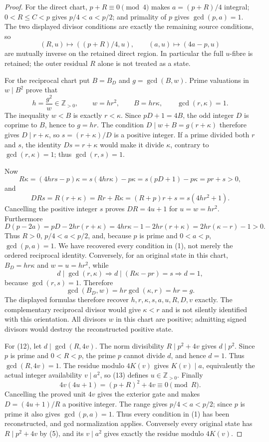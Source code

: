 \begin{proof}
For the direct chart, $p+R\equiv0\pmod4$ makes $a=(p+R)/4$ integral;
$0<R\le C<p$ gives $p/4<a<p/2$; and primality of $p$ gives
$\gcd(p,a)=1$.  The two displayed divisor conditions are exactly the
remaining source conditions, so
\[
 (R,u)\longmapsto ((p+R)/4,u),\qquad
 (a,u)\longmapsto(4a-p,u)
\]
are mutually inverse on the retained direct region.  In particular the full
$u$-fibre is retained; the outer residual $R$ alone is not treated as a state.

For the reciprocal chart put $B=B_D$ and
$g=\gcd(B,w)$.  Prime valuations in $w\mid B^2$ prove that
\[
 h=\frac{g^2}{w}\in\mathbb Z_{>0},\qquad
 w=hr^2,\qquad B=hr\kappa,\qquad \gcd(r,\kappa)=1.
\]
The inequality $w<B$ is exactly $r<\kappa$.  Since $pD+1=4B$, the odd
integer $D$ is coprime to $B$, hence to $g=hr$.  The condition
$D\mid w+B=g(r+\kappa)$ therefore gives $D\mid r+\kappa$, so
$s=(r+\kappa)/D$ is a positive integer.  If a prime divided both $r$ and
$s$, the identity $Ds=r+\kappa$ would make it divide $\kappa$, contrary to
$\gcd(r,\kappa)=1$; thus $\gcd(r,s)=1$.

Now
\[
 R\kappa=(4hrs-p)\kappa
 =s(4hr\kappa)-p\kappa
 =s(pD+1)-p\kappa=pr+s>0,
\]
and
\[
 DRs=R(r+\kappa)=Rr+R\kappa
 =(R+p)r+s=s(4hr^2+1).
\]
Cancelling the positive integer $s$ proves $DR=4u+1$ for
$u=w=hr^2$.  Furthermore
\[
 D(p-2a)=pD-2hr(r+\kappa)
 =4hr\kappa-1-2hr(r+\kappa)
 =2hr(\kappa-r)-1>0.
\]
Thus $R>0$, $p/4<a<p/2$, and, because $p$ is prime and $0<a<p$,
$\gcd(p,a)=1$.  We have recovered every condition in (1), not merely the
ordered reciprocal identity.  Conversely, for an original state in this
chart, $B_D=hr\kappa$ and $w=u=hr^2$, while
\[
 d\mid\gcd(r,\kappa)\Longrightarrow d\mid(R\kappa-pr)=s
 \Longrightarrow d=1,
\]
because $\gcd(r,s)=1$.  Therefore
\[
 \gcd(B_D,w)=hr\gcd(\kappa,r)=hr=g.
\]
The displayed formulas therefore recover $h,r,\kappa,s,a,u,R,D,v$ exactly.
The complementary reciprocal divisor would give $\kappa<r$ and is not silently
identified with this orientation.  All divisors $w$ in this chart are positive;
admitting signed divisors would destroy the reconstructed positive state.

For (12), let $d\mid\gcd(R,4v)$.  The norm divisibility
$R\mid p^2+4v$ gives $d\mid p^2$.  Since $p$ is prime and $0<R<p$, the
prime $p$ cannot divide $d$, and hence $d=1$.  Thus
$\gcd(R,4v)=1$. The residue modulo $4K(v)$ gives $K(v)\mid a$, equivalently
the actual integer availability $v\mid a^2$, so (13) defines
$u\in\mathbb Z_{>0}$. Finally
\[
 4v(4u+1)=(p+R)^2+4v\equiv0\pmod R.
\]
Cancelling the proved unit $4v$ gives the exterior gate and makes
$D=(4u+1)/R$ a positive integer. The range gives $p/4<a<p/2$; since $p$ is
prime it also gives $\gcd(p,a)=1$. Thus every condition in (1) has been
reconstructed, and gcd normalization applies. Conversely every original
state has $R\mid p^2+4v$ by (5), and its $v\mid a^2$ gives exactly the residue
modulo $4K(v)$.


\end{proof}
